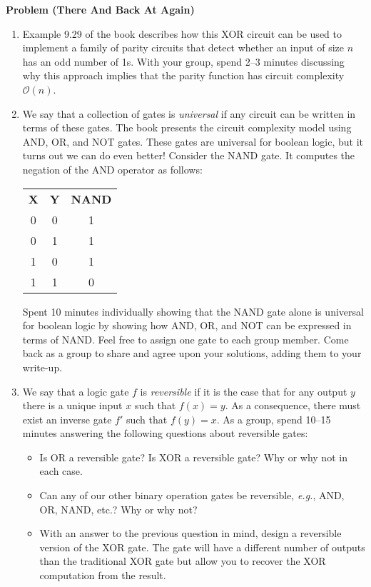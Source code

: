 \documentclass[12pt]{article}
\newcommand{\bigO}[1]{\ensuremath{\mathcal{O}(#1)}}
\newcommand{\eg}{\emph{e.g.}\xspace}
\newcounter{ProblemCounter}
\newenvironment{problem}[1][]
  {\refstepcounter{ProblemCounter}\noindent\textbf{Problem \theProblemCounter{} (#1)}\quad}
  {\newpage}
\newcommand{\answerbelow}{\noindent\makebox[\linewidth]{\rule{\textwidth}{0.4pt}}}
\begin{document}
\begin{problem}[There And Back At Again]
\begin{enumerate}
    Come back as a group and compare your answers.  Give your final solution in
    your write-up.
  \item Example 9.29 of the book describes how this XOR circuit can be used to
    implement a family of parity circuits that detect whether an input of size
    \( n \) has an odd number of 1s.  With your group, spend 2--3 minutes
    discussing why this approach implies that the parity function has circuit
    complexity \bigO{n}.
  \item We say that a collection of gates is \emph{universal} if any circuit
    can be written in terms of these gates.  The book presents the circuit
    complexity model using AND, OR, and NOT gates.  These gates are universal
    for boolean logic, but it turns out we can do even better!  Consider the
    NAND gate.  It computes the negation of the AND operator as follows:
    \begin{center}
      \begin{tabular}{ccc}
        \textbf{X} & \textbf{Y} & \textbf{NAND} \\
        0          & 0          & 1             \\
        0          & 1          & 1             \\
        1          & 0          & 1             \\
        1          & 1          & 0
      \end{tabular}
    \end{center}
    Spent 10 minutes individually showing that the NAND gate alone is universal
    for boolean logic by showing how AND, OR, and NOT can be expressed in terms
    of NAND.  Feel free to assign one gate to each group member.  Come back as
    a group to share and agree upon your solutions, adding them to your
    write-up.
  \item We say that a logic gate \( f \) is \emph{reversible} if it is the case
    that for any output \( y \) there is a unique input \( x \) such that \(
    f(x) = y \).  As a consequence, there must exist an inverse gate \( f' \)
    such that \( f(y) = x \).  As a group, spend 10--15 minutes answering the
    following questions about reversible gates:
    \begin{itemize}
      \item Is OR a reversible gate?  Is XOR a reversible gate?  Why or why not
        in each case.
      \item Can any of our other binary operation gates be reversible, \eg,
        AND, OR, NAND, etc.?  Why or why not?
      \item With an answer to the previous question in mind, design a
        reversible version of the XOR gate.  The gate will have a different
        number of outputs than the traditional XOR gate but allow you to
        recover the XOR computation from the result.
    \end{itemize}
\end{enumerate}

\answerbelow

\end{problem}

\end{document}
